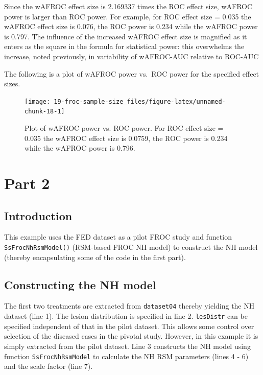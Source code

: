 \documentclass[
]{book}
\begin{document}
Since the wAFROC effect size is 2.169337 times the ROC effect size, wAFROC power is larger than ROC power. For example, for ROC effect size = 0.035 the wAFROC effect size is 0.076, the ROC power is 0.234 while the wAFROC power is 0.797. The influence of the increased wAFROC effect size is magnified as it enters as the square in the formula for statistical power: this overwhelms the increase, noted previously, in variability of wAFROC-AUC relative to ROC-AUC

The following is a plot of wAFROC power vs.~ROC power for the specified effect sizes.

\begin{figure}

{\centering \texttt{[image: 19-froc-sample-size\_files/figure-latex/unnamed-chunk-18-1]} 

}

\caption{Plot of wAFROC power vs. ROC power. For ROC effect size = 0.035 the wAFROC effect size is 0.0759, the ROC power is 0.234 while the wAFROC power is 0.796.}\label{fig:unnamed-chunk-18}
\end{figure}

\hypertarget{part-2}{%
\section{Part 2}\label{part-2}}

\hypertarget{introduction}{%
\subsection{Introduction}\label{introduction}}

This example uses the FED dataset as a pilot FROC study and function \texttt{SsFrocNhRsmModel()} (RSM-based FROC NH model) to construct the NH model (thereby encapsulating some of the code in the first part).

\hypertarget{constructing-the-nh-model}{%
\subsection{Constructing the NH model}\label{constructing-the-nh-model}}

The first two treatments are extracted from \texttt{dataset04} thereby yielding the NH dataset (line 1). The lesion distribution is specified in line 2. \texttt{lesDistr} can be specified independent of that in the pilot dataset. This allows some control over selection of the diseased cases in the pivotal study. However, in this example it is simply extracted from the pilot dataset. Line 3 constructs the NH model using function \texttt{SsFrocNhRsmModel} to calculate the NH RSM parameters (lines 4 - 6) and the scale factor (line 7).
\end{document}
